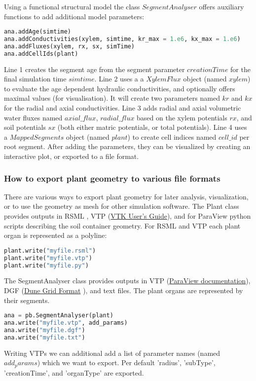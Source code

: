 Using a functional structural model the class $SegmentAnalyser$ offers auxiliary functions to add additional model parameters:
\begin{lstlisting}[language=Python]
ana.addAge(simtime) 
ana.addConductivities(xylem, simtime, kr_max = 1.e6, kx_max = 1.e6)
ana.addFluxes(xylem, rx, sx, simTime)
ana.addCellIds(plant) 
\end{lstlisting}
Line 1 creates the segment age from the segment parameter $creationTime$ for the final simulation time $simtime$. Line 2 uses a a $XylemFlux$ object (named $xylem$) to evaluate the age dependent hydraulic conductivities, and optionally offers maximal values (for visualisation). It will create two parameters named $kr$ and $kx$ for the radial and axial conductivities.  Line 3 adds radial and axial volumetric water fluxes named  $axial\_flux$, $radial\_flux$ based on the xylem potentials $rx$, and soil potentials $sx$ (both either matric potentials, or total potentials). Line 4 uses a $MappedSegments$ object (named $plant$) to create cell indices named $cell\_id$ per root segment. After adding the parameters, they can be visualized by creating an interactive plot, or exported to a file format. 


\subsubsection*{How to export plant geometry to various file formats}

There are various ways to export plant geometry for later analysis, visualization, or to use the geometry as mesh for other simulation software. The Plant class provides outputs in RSML \citep{lobet2015root}, VTP (\href{https://vtk.org/vtk-users-guide/}{VTK User's Guide}), and for ParaView python scripts describing the soil container geometry. For RSML and VTP each plant organ is represented as a polyline:
\begin{lstlisting}[language=Python]
plant.write("myfile.rsml")
plant.write("myfile.vtp")
plant.write("myfile.py")
\end{lstlisting}

The SegmentAnalyser class provides outputs in VTP (\href{https://docs.paraview.org/en/latest/ReferenceManual/index.html}{ParaView documentation}), DGF (\href{https://dune-project.org/doxygen/2.4.1/group__DuneGridFormatParser.html}{Dune Grid Format} ), and text files. The plant organs are represented by their segments.
\begin{lstlisting}[language=Python]
ana = pb.SegmentAnalyser(plant)
ana.write("myfile.vtp", add_params)
ana.write("myfile.dgf")
ana.write("myfile.txt")
\end{lstlisting}
Writing VTPs we can additional add a list of parameter names (named $add_params$) which we want to export. Per default 'radius', 'subType', 'creationTime', and 'organType' are exported. 


